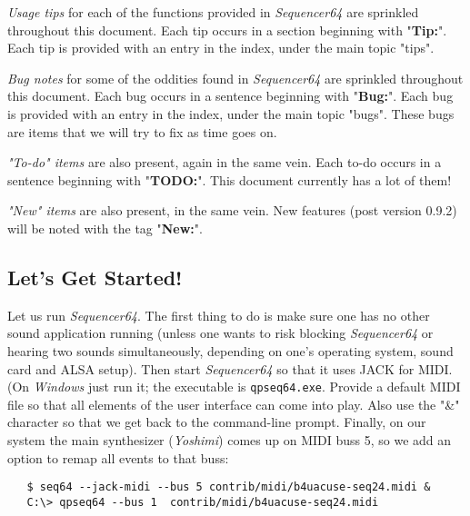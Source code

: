 \documentclass[
 11pt,
 twoside,
 a4paper,
 headinclude,
 footinclude,
 final                                 %
]{article}
\begin{document}
   \textsl{Usage tips}
   for each of the functions provided in
   \textsl{Sequencer64} are sprinkled throughout this document.
   Each tip occurs in a section beginning with "\textbf{Tip:}".
   Each tip is provided with an entry in the index, under the
   main topic "tips".

   \textsl{Bug notes}
   for some of the oddities found in \textsl{Sequencer64} are
   sprinkled throughout this document.
   Each bug occurs in a sentence beginning with "\textbf{Bug:}".
   Each bug is provided with an entry in the index, under the
   main topic "bugs".  These bugs are items that we will try to
   fix as time goes on.

   \textsl{"To-do" items}
   are also present, again in the same vein.
   Each to-do occurs in a sentence beginning with "\textbf{TODO:}".
   This document currently has a lot of them!

   \textsl{"New" items}
   are also present, in the same vein.
   New features (post version 0.9.2) will be noted with the tag
   "\textbf{New:}".

\subsection{Let's Get Started!}
\label{subsec:introduction_lets_get_started}

   Let us run \textsl{Sequencer64}.
   The first
   thing to do is make sure one has no other sound application running
   (unless one wants to risk blocking \textsl{Sequencer64} or hearing two
   sounds simultaneously, depending on one's operating system,
   sound card and ALSA setup).
   Then start \textsl{Sequencer64} so that it uses JACK for MIDI.
   (On \textsl{Windows} just run it; the executable is
   \texttt{qpseq64.exe}.
   Provide a
   default MIDI file so that all elements of the user interface can come
   into play.  Also use the "\&" character so that we get back to the
   command-line prompt.  Finally, on our system the main synthesizer
   (\textsl{Yoshimi}) comes up on MIDI buss 5, so we add an option to remap
   all events to that buss:


\begin{verbatim}
   $ seq64 --jack-midi --bus 5 contrib/midi/b4uacuse-seq24.midi &
   C:\> qpseq64 --bus 1  contrib/midi/b4uacuse-seq24.midi
\end{verbatim}
\end{document}
